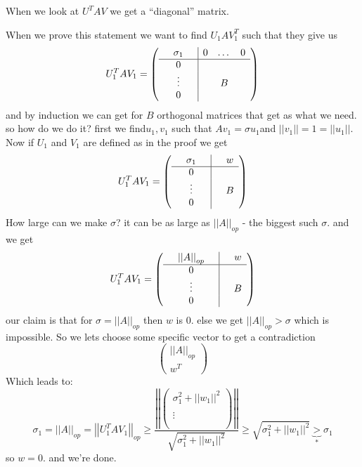 When we look at $U^{T}AV$ we get a ``diagonal'' matrix.

When we prove this statement we want to find $U_{1}AV_{1}^{T}$ such
that they give us 
\[
U_{1}^{T}AV_{1}=\left(\begin{array}{ccc|ccc}
 & \sigma_{1} &  & 0 & \dots & 0\\
\hline  & 0 & \\
 & \vdots &  &  & B\\
 & 0 & 
\end{array}\right)
\]
 and by induction we can get for $B$ orthogonal matrices that get
as what we need. so how do we do it? first we find$u_{1},v_{1}$ such
that $Av_{1}=\sigma u_{1}$and $\left|\left|v_{1}\right|\right|=1=\left|\left|u_{1}\right|\right|$.
Now if $U_{1}$ and $V_{1}$ are defined as in the proof we get
\[
U_{1}^{T}AV_{1}=\left(\begin{array}{ccc|ccc}
 & \sigma_{1} &  &  & w\\
\hline  & 0 & \\
 & \vdots &  &  & B\\
 & 0 & 
\end{array}\right)
\]
How large can we make $\sigma$? it can be as large as $\left|\left|A\right|\right|_{op}$
- the biggest such $\sigma$. and we get 
\[
U_{1}^{T}AV_{1}=\left(\begin{array}{ccc|ccc}
 & \left|\left|A\right|\right|_{op} &  &  & w\\
\hline  & 0 & \\
 & \vdots &  &  & B\\
 & 0 & 
\end{array}\right)
\]
 our claim is that for $\sigma=\left|\left|A\right|\right|_{op}$
then $w$ is 0. else we get $\left|\left|A\right|\right|_{op}>\sigma$
which is impossible. So we lets choose some specific vector to get
a contradiction 
\[
\left(\begin{array}{c}
\left|\left|A\right|\right|_{op}\\
\hline w^{T}
\end{array}\right)
\]
Which leads to:
\[
\sigma_{1}=\left|\left|A\right|\right|_{op}=\left|\left|U_{1}^{T}AV_{1}\right|\right|_{op}\ge\frac{\left|\left|\left(\begin{array}{c}
\sigma_{1}^{2}+\left|\left|w_{1}\right|\right|^{2}\\
\\
\vdots\\
\\
\end{array}\right)\right|\right|}{\sqrt{\sigma_{1}^{2}+\left|\left|w_{1}\right|\right|^{2}}}\ge\sqrt{\sigma_{1}^{2}+\left|\left|w_{1}\right|\right|^{2}}\underbrace{>}_{\text{*}}\sigma_{1}
\]
 so $w=0$. and we're done.

